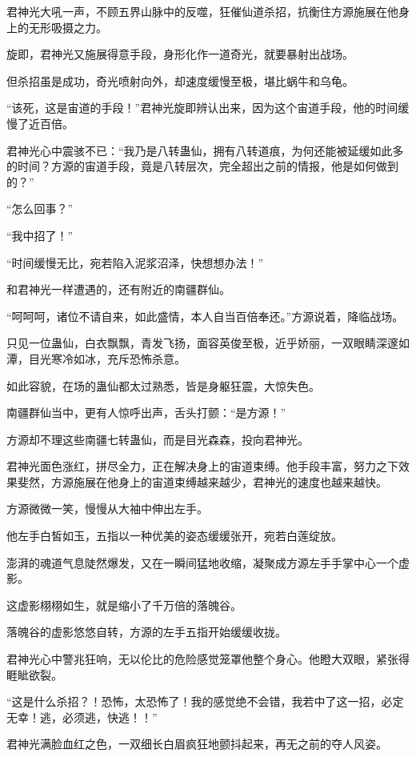 \begin{this_body}
君神光大吼一声，不顾五界山脉中的反噬，狂催仙道杀招，抗衡住方源施展在他身上的无形吸摄之力。

旋即，君神光又施展得意手段，身形化作一道奇光，就要暴射出战场。

但杀招虽是成功，奇光喷射向外，却速度缓慢至极，堪比蜗牛和乌龟。

“该死，这是宙道的手段！”君神光旋即辨认出来，因为这个宙道手段，他的时间缓慢了近百倍。

君神光心中震骇不已：“我乃是八转蛊仙，拥有八转道痕，为何还能被延缓如此多的时间？方源的宙道手段，竟是八转层次，完全超出之前的情报，他是如何做到的？”

“怎么回事？”

“我中招了！”

“时间缓慢无比，宛若陷入泥浆沼泽，快想想办法！”

和君神光一样遭遇的，还有附近的南疆群仙。

“呵呵呵，诸位不请自来，如此盛情，本人自当百倍奉还。”方源说着，降临战场。

只见一位蛊仙，白衣飘飘，青发飞扬，面容英俊至极，近乎娇丽，一双眼睛深邃如潭，目光寒冷如冰，充斥恐怖杀意。

如此容貌，在场的蛊仙都太过熟悉，皆是身躯狂震，大惊失色。

南疆群仙当中，更有人惊呼出声，舌头打颤：“是方源！”

方源却不理这些南疆七转蛊仙，而是目光森森，投向君神光。

君神光面色涨红，拼尽全力，正在解决身上的宙道束缚。他手段丰富，努力之下效果斐然，方源施展在他身上的宙道束缚越来越少，君神光的速度也越来越快。

方源微微一笑，慢慢从大袖中伸出左手。

他左手白皙如玉，五指以一种优美的姿态缓缓张开，宛若白莲绽放。

澎湃的魂道气息陡然爆发，又在一瞬间猛地收缩，凝聚成方源左手手掌中心一个虚影。

这虚影栩栩如生，就是缩小了千万倍的落魄谷。

落魄谷的虚影悠悠自转，方源的左手五指开始缓缓收拢。

君神光心中警兆狂响，无以伦比的危险感觉笼罩他整个身心。他瞪大双眼，紧张得睚眦欲裂。

“这是什么杀招？！恐怖，太恐怖了！我的感觉绝不会错，我若中了这一招，必定无幸！逃，必须逃，快逃！！”

君神光满脸血红之色，一双细长白眉疯狂地颤抖起来，再无之前的夺人风姿。


\end{this_body}
